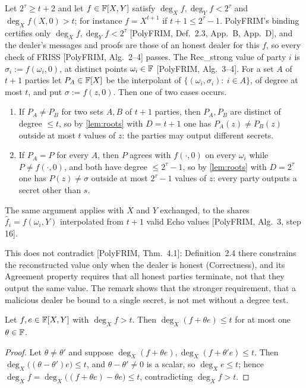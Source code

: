 \begin{remark}\label{rem:avss-threshold}
Let $2^\tau\ge t+2$ and let $f\in\mathbb{F}[X,Y]$ satisfy $\deg_Xf,\deg_Yf<2^\tau$ and
$\deg_Xf(X,0)>t$; for instance $f=X^{t+1}$ if $t+1\le2^\tau-1$. PolyFRIM's binding certifies
only $\deg_Xf,\deg_Yf<2^\tau$ {[PolyFRIM, Def.~2.3, App.~B, App.~D]}, and the dealer's messages
and proofs are those of an honest dealer for this $f$, so every check of FRISS
{[PolyFRIM, Alg.~2--4]} passes. The Rec\_strong value of party $i$ is $\sigma_i:=f(\omega_i,0)$, at
distinct points $\omega_i\in\mathbb{F}$ {[PolyFRIM, Alg.~3--4]}. For a set $A$ of $t+1$ parties let
$P_A\in\mathbb{F}[X]$ be the interpolant of $\{(\omega_i,\sigma_i):\ i\in A\}$, of degree at most $t$, and put
$\sigma:=f(z,0)$. Then one of two cases occurs.
\begin{enumerate}
\item If $P_A\ne P_B$ for two sets $A,B$ of $t+1$ parties, then $P_A,P_B$ are distinct of
degree $\le t$, so by \cref{lem:roots} with $D=t+1$ one has $P_A(z)\ne P_B(z)$ outside at most $t$
values of $z$: the parties may output different secrets.
\item If $P_A=P$ for every $A$, then $P$ agrees with $f(\cdot,0)$ on every $\omega_i$ while
$P\ne f(\cdot,0)$, and both have degree $\le2^\tau-1$, so by \cref{lem:roots} with $D=2^\tau$ one has
$P(z)\ne\sigma$ outside at most $2^\tau-1$ values of $z$: every party outputs a secret other than
$s$.
\end{enumerate}
The same argument applies with $X$ and $Y$ exchanged, to the shares $\hat f_i=f(\omega_i,Y)$
interpolated from $t+1$ valid Echo values {[PolyFRIM, Alg.~3, step 16]}.

This does not contradict {[PolyFRIM, Thm.~4.1]}: Definition~2.4 there constrains the
reconstructed value only when the dealer is honest (Correctness), and its Agreement property
requires that all honest parties terminate, not that they output the same value. The remark
shows that the stronger requirement, that a malicious dealer be bound to a single secret, is not
met without a degree test.
\end{remark}


\begin{lemma}\label{lem:avss-bad}
Let $f,e\in\mathbb{F}[X,Y]$ with $\deg_Xf>t$. Then $\deg_X(f+\theta e)\le t$ for at most one
$\theta\in\mathbb{F}$.
\end{lemma}

\begin{proof}
Let $\theta\ne\theta'$ and suppose $\deg_X(f+\theta e),\deg_X(f+\theta'e)\le t$. Then
$\deg_X\big((\theta-\theta')e\big)\le t$, and $\theta-\theta'\ne0$ is a scalar, so $\deg_Xe\le t$;
hence $\deg_Xf=\deg_X\big((f+\theta e)-\theta e\big)\le t$, contradicting $\deg_Xf>t$.
\end{proof}
